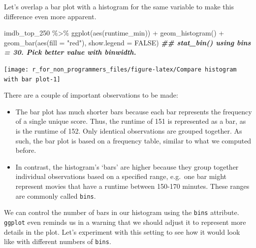 \documentclass[
]{book}
\newenvironment{Shaded}{\begin{snugshade}}{\end{snugshade}}
\newcommand{\AttributeTok}[1]{\textcolor[rgb]{0.77,0.63,0.00}{#1}}
\newcommand{\ConstantTok}[1]{\textcolor[rgb]{0.00,0.00,0.00}{#1}}
\newcommand{\DocumentationTok}[1]{\textcolor[rgb]{0.56,0.35,0.01}{\textbf{\textit{#1}}}}
\newcommand{\FunctionTok}[1]{\textcolor[rgb]{0.00,0.00,0.00}{#1}}
\newcommand{\NormalTok}[1]{#1}
\newcommand{\SpecialCharTok}[1]{\textcolor[rgb]{0.00,0.00,0.00}{#1}}
\newcommand{\StringTok}[1]{\textcolor[rgb]{0.31,0.60,0.02}{#1}}
\begin{document}
Let's overlap a bar plot with a histogram for the same variable to make this difference even more apparent.

\begin{Shaded}
\begin{Highlighting}[]
\NormalTok{imdb\_top\_250 }\SpecialCharTok{\%\textgreater{}\%} 
  \FunctionTok{ggplot}\NormalTok{(}\FunctionTok{aes}\NormalTok{(runtime\_min)) }\SpecialCharTok{+}
  \FunctionTok{geom\_histogram}\NormalTok{() }\SpecialCharTok{+}
  \FunctionTok{geom\_bar}\NormalTok{(}\FunctionTok{aes}\NormalTok{(}\AttributeTok{fill =} \StringTok{"red"}\NormalTok{), }\AttributeTok{show.legend =} \ConstantTok{FALSE}\NormalTok{)}
\DocumentationTok{\#\# \textasciigrave{}stat\_bin()\textasciigrave{} using \textasciigrave{}bins = 30\textasciigrave{}. Pick better value with \textasciigrave{}binwidth\textasciigrave{}.}
\end{Highlighting}
\end{Shaded}

\begin{center}\texttt{[image: r\_for\_non\_programmers\_files/figure-latex/Compare histogram with bar plot-1]} \end{center}

There are a couple of important observations to be made:

\begin{itemize}
\item
  The bar plot has much shorter bars because each bar represents the frequency of a single unique score. Thus, the runtime of 151 is represented as a bar, as is the runtime of 152. Only identical observations are grouped together. As such, the bar plot is based on a frequency table, similar to what we computed before.
\item
  In contrast, the histogram's `bars' are higher because they group together individual observations based on a specified range, e.g.~one bar might represent movies that have a runtime between 150-170 minutes. These ranges are commonly called \texttt{bins}.
\end{itemize}

We can control the number of bars in our histogram using the \texttt{bins} attribute. \texttt{ggplot} even reminds us in a warning that we should adjust it to represent more details in the plot. Let's experiment with this setting to see how it would look like with different numbers of \texttt{bins}.
\end{document}
